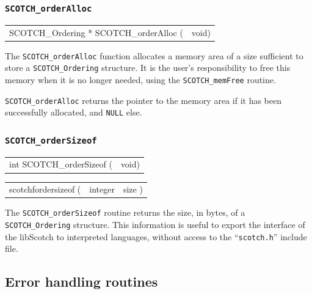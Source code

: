 \subsubsection{{\tt SCOTCH\_orderAlloc}}

\begin{itemize}
\progsyn

{\tt\begin{tabular}{l@{}l}
SCOTCH\_Ordering * SCOTCH\_orderAlloc ( & void)
\end{tabular}}

\progdes

The {\tt SCOTCH\_orderAlloc} function allocates a memory area of a
size sufficient to store a {\tt SCOTCH\_\lbt Ordering} structure. It is
the user's responsibility to free this memory when it is no longer
needed, using the {\tt SCOTCH\_\lbt mem\lbt Free} routine.

\progret

{\tt SCOTCH\_orderAlloc} returns the pointer to the memory area if it
has been successfully allocated, and {\tt NULL} else.
\end{itemize}

\subsubsection{{\tt SCOTCH\_orderSizeof}}

\begin{itemize}
\progsyn

{\tt\begin{tabular}{l@{}l}
int SCOTCH\_orderSizeof ( & void)
\end{tabular}}

{\tt\begin{tabular}{l@{}ll}
scotchfordersizeof ( & integer & size )
\end{tabular}}

\progdes

The {\tt SCOTCH\_orderSizeof} routine returns the size, in bytes, of a
{\tt SCOTCH\_\lbt Ordering} structure. This information is useful to
export the interface of the {\sc libScotch} to interpreted languages,
without access to the ``{\tt scotch.h}'' include file.
\end{itemize}

\subsection{Error handling routines}
\label{sec-lib-error}

